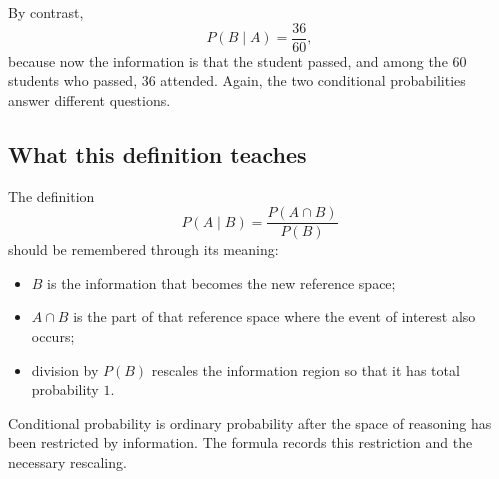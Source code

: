By contrast,
\[
P(B\mid A)=\frac{36}{60},
\]
because now the information is that the student passed, and among the \(60\)
students who passed, \(36\) attended. Again, the two conditional probabilities
answer different questions.

\subsection*{What this definition teaches}

The definition
\[
P(A\mid B)=\frac{P(A\cap B)}{P(B)}
\]
should be remembered through its meaning:

\begin{itemize}
    \item \(B\) is the information that becomes the new reference space;
    \item \(A\cap B\) is the part of that reference space where the event of
    interest also occurs;
    \item division by \(P(B)\) rescales the information region so that it has
    total probability \(1\).
\end{itemize}

\begin{theorembox}
Conditional probability is ordinary probability after the space of reasoning has
been restricted by information. The formula records this restriction and the
necessary rescaling.
\end{theorembox}
